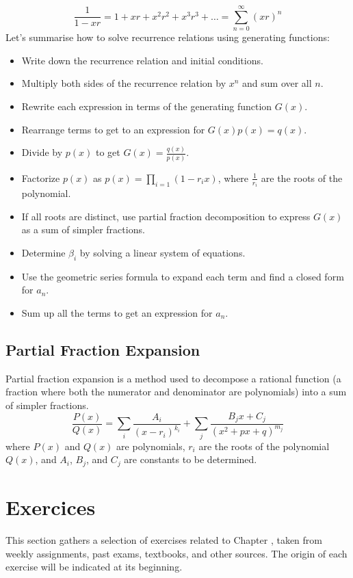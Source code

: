 \[ \frac{1}{1 - xr} = 1 + xr + x^2r^2 + x^3r^3 + \ldots = \sum_{n=0}^{\infty} (xr)^n \]
Let's summarise how to solve recurrence relations using generating functions:
\begin{itemize}[itemsep=1pt,label=$\circ$]
    \item Write down the recurrence relation and initial conditions.
    \item Multiply both sides of the recurrence relation by $x^n$ and sum over all $n$.
    \item Rewrite each expression in terms of the generating function $G(x)$.
    \item Rearrange terms to get to an expression for $G(x)p(x) = q(x)$.
    \item Divide by $p(x)$ to get $G(x) = \frac{q(x)}{p(x)}$.
    \item Factorize $p(x)$ as $p(x) = \prod_{i=1} (1 - r_ix)$, where $\frac{1}{r_i}$ are the roots of the polynomial.
    \item If all roots are distinct, use partial fraction decomposition to express $G(x)$ as a sum of simpler fractions.
    \item Determine $\beta_i$ by solving a linear system of equations.
    \item Use the geometric series formula to expand each term and find a closed form for $a_n$.
    \item Sum up all the terms to get an expression for $a_n$.
\end{itemize}

\subsection{Partial Fraction Expansion}
\begin{definition}
    Partial fraction expansion is a method used to decompose a rational function (a fraction where both the numerator and denominator are polynomials) into a sum of simpler fractions.
    \[ \frac{P(x)}{Q(x)} = \sum_{i} \frac{A_i}{(x - r_i)^{k_i}} + \sum_{j} \frac{B_j x + C_j}{(x^2 + px + q)^{m_j}} \]
    where $P(x)$ and $Q(x)$ are polynomials, $r_i$ are the roots of the polynomial $Q(x)$, and $A_i$, $B_j$, and $C_j$ are constants to be determined.
\end{definition}

\section{Exercices}
This section gathers a selection of exercises related to Chapter \thechapter, taken from weekly assignments, past exams, textbooks, and other sources. The origin of each exercise will be indicated at its beginning.


